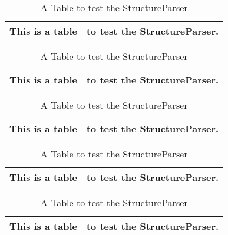 \begin{table}
	\begin{center}\footnotesize
		\begin{tabular}{||c|c||}
			\hline
			This is a table & to test the StructureParser.\\
			\hline
			
			\hline
		\end{tabular}
	\end{center}
	\caption{A Table to test the StructureParser}
\end{table}

\clearpage

\begin{table}
	\begin{center}\footnotesize
		\begin{tabular}{||c|c||}
			\hline
			This is a table & to test the StructureParser.\\
			\hline
			
			\hline
		\end{tabular}
	\end{center}
	\caption{A Table to test the StructureParser}
\end{table}

\begin{table}
	\begin{center}\footnotesize
		\begin{tabular}{||c|c||}
			\hline
			This is a table & to test the StructureParser.\\
			\hline
			
			\hline
		\end{tabular}
	\end{center}
	\caption{A Table to test the StructureParser}
\end{table}

\clearpage

\begin{table}
	\begin{center}\footnotesize
		\begin{tabular}{||c|c||}
			\hline
			This is a table & to test the StructureParser.\\
			\hline
			
			\hline
		\end{tabular}
	\end{center}
	\caption{A Table to test the StructureParser}
\end{table}

\begin{table}
	\begin{center}\footnotesize
		\begin{tabular}{||c|c||}
			\hline
			This is a table & to test the StructureParser.\\
			\hline
			
			\hline
		\end{tabular}
	\end{center}
	\caption{A Table to test the StructureParser}
\end{table}

